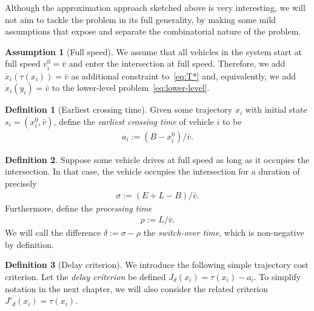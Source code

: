\documentclass[a4paper]{report}
\theoremstyle{definition}
\newtheorem{define}{Definition}[chapter]
\newtheorem{assump}{Assumption}[chapter]
\theoremstyle{plain}
\begin{document}
Although the approximation approach sketched above is very interesting, we will
not aim to tackle the problem in its full generality, by making some mild
assumptions that expose and separate the combinatorial nature of the problem.

\begin{assump}[Full speed]
  We assume that all vehicles in the system start at full speed
  $v_{i}^{0} = \bar{v}$ and enter the intersection at full speed.
  Therefore, we add $\dot{x}_{i}(\tau(x_{i})) = \bar{v}$ as additional constraint
  to~\eqref{eq:T*} and, equivalently, we add $\dot{x}_{i}(y_{i}) = \bar{v}$ to the
  lower-level problem~\eqref{eq:lower-level}.
\end{assump}

\begin{define}[Earliest crossing time]
  Given some trajectory $x_i$ with initial state $s_i = (x_i^0, \bar{v})$, define
  the \emph{earliest crossing time} of vehicle $i$ to be
  \begin{align}
    \label{eq:5}
    a_i := (B - x_i^0) / \bar{v} .
  \end{align}
\end{define}

\begin{define}
  Suppose some vehicle drives at full speed as long as it occupies the
  intersection. In that case, the vehicle occupies the intersection for a duration of precisely
  \begin{align}
    \sigma := (E+L-B)/\bar{v} .
  \end{align}
  Furthermore, define the \emph{processing time}
  \begin{align}
    \rho := L / \bar{v} .
  \end{align}
  We will call the difference $\delta := \sigma - \rho$ the \emph{switch-over
    time}, which is non-negative by definition.
\end{define}

\begin{define}[Delay criterion]
  We introduce the following simple trajectory cost criterion. Let the \emph{delay criterion}
  be defined $J_d(x_i) = \tau(x_i) - a_i$. To simplify notation in the
  next chapter, we will also consider the related criterion
  $J'_d(x_i) = \tau(x_i)$.
\end{define}
\end{document}
